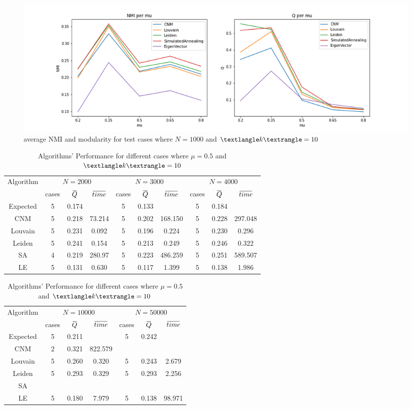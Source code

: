 \documentclass[11pt,a4paper]{article}
\newcommand{\overbar}[1]{\mkern 1.5mu\overline{\mkern-1.5mu#1\mkern-1.5mu}\mkern 1.5mu}
\begin{document}
\begin{figure}[H]
	\includegraphics[width=\linewidth]{per-mu.png}
	\caption{average NMI and modularity for test cases where $N = 1000$ and $\textlangle k \textrangle = 10$}
	\label{fig:per-mu}
\end{figure}

\begin{table}[t]
	\centering
	\caption{Algorithms' Performance for different cases where $\mu = 0.5$ and $\textlangle k \textrangle = 10$}\label{tbl:summaryN}
	\begin{tabular}{c|ccc|ccc|ccc}
		\multirow{2}{*}{Algorithm}&\multicolumn{3}{c|}{$N = 2000$}&\multicolumn{3}{c|}{$N = 3000$}&\multicolumn{3}{c}{$N = 4000$}\\
		&cases&$\overbar{Q}$&$\overbar{time}$&cases&$\overbar{Q}$&$\overbar{time}$&cases&$\overbar{Q}$&$\overbar{time}$\\
		Expected&5&0.174&&5&0.133&&5&0.184&\\
		\midrule
		CNM&5&0.218&73.214&5&0.202&168.150&5&0.228&297.048\\
		Louvain&5&0.231&0.092&5&0.196&0.224&5&0.230&0.296\\
		Leiden&5&0.241&0.154&5&0.213&0.249&5&0.246&0.322\\
		SA&4&0.219&280.97&5&0.223&486.259&5&0.251&589.507\\
		LE&5&0.131&0.630&5&0.117&1.399&5&0.138&1.986\\
	\end{tabular}
	
	\begin{tabular}{c|ccc|ccc}
		\multirow{2}{*}{Algorithm}&\multicolumn{3}{c|}{$N = 10000$}&\multicolumn{3}{c}{$N = 50000$}\\
		&cases&$\overbar{Q}$&$\overbar{time}$&cases&$\overbar{Q}$&$\overbar{time}$\\
		Expected&5&0.211&&5&0.242&\\
		\midrule
		CNM&2&0.321&822.579&\multicolumn{3}{c}{\textemdash}\\
		Louvain&5&0.260&0.320&5&0.243&2.679\\
		Leiden&5&0.293&0.329&5&0.293&2.256\\
		SA&\multicolumn{3}{c|}{\textemdash}&\multicolumn{3}{c}{\textemdash}\\
		LE&5&0.180&7.979&5&0.138&98.971\\
	\end{tabular}
\end{table} 
\end{document}
